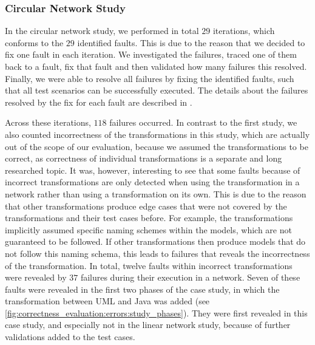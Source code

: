 \subsubsection*{Circular Network Study} 

In the circular network study, we performed in total $29$ iterations, which conforms to the $29$ identified faults.
This is due to the reason that we decided to fix one fault in each iteration.
We investigated the failures, traced one of them back to a fault, fix that fault and then validated how many failures this resolved.
Finally, we were able to resolve all failures by fixing the identified faults, such that all test scenarios can be successfully executed.
The details about the failures resolved by the fix for each fault are described in \cite{saglam2020ma}.

Across these iterations, $118$ failures occurred.
In contrast to the first study, we also counted incorrectness of the transformations in this study, which are actually out of the scope of our evaluation, because we assumed the transformations to be correct, as correctness of individual transformations is a separate and long researched topic.
It was, however, interesting to see that some faults because of incorrect transformations are only detected when using the transformation in a network rather than using a transformation on its own.
This is due to the reason that other transformations produce edge cases that were not covered by the transformations and their test cases before.
For example, the transformations implicitly assumed specific naming schemes within the models, which are not guaranteed to be followed.
If other transformations then produce models that do not follow this naming schema, this leads to failures that reveals the incorrectness of the transformation.
In total, twelve faults within incorrect transformations were revealed by $37$ failures during their execution in a network.
Seven of these faults were revealed in the first two phases of the case study, in which the transformation between \gls{UML} and Java was added (see \autoref{fig:correctness_evaluation:errors:study_phases}).
They were first revealed in this case study, and especially not in the linear network study, because of further validations added to the test cases.


